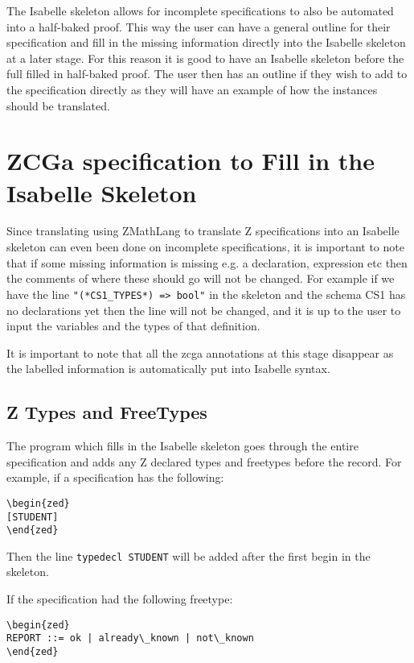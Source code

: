 The Isabelle skeleton allows for incomplete specifications to also be automated into a half-baked proof. This way the user can have a general outline for their specification and fill in the missing information directly into the Isabelle skeleton at a later stage. For this reason it is good to have an Isabelle skeleton before the full filled in half-baked proof. The user then has an outline if they wish to add to the specification directly as they will have an example of how the instances should be translated.

\section{ZCGa specification to Fill in the Isabelle Skeleton}
\label{sec:zcga2fillin}

Since translating using ZMathLang to translate Z specifications into an Isabelle skeleton can even been done on incomplete specifications, it is important to note that if some missing information is missing e.g. a declaration, expression etc then the comments of where these should go will not be changed. 
For example if we have the line \verb|"(*CS1_TYPES*) => bool"| in the skeleton and the schema CS1 has no declarations yet then the line will not be changed, and it is up to the user to input the variables and the types of that definition.

It is important to note that all the \gls{zcga} annotations at this stage disappear as the labelled information is automatically put into Isabelle syntax.

\subsection{Z Types and FreeTypes}

The program which fills in the Isabelle skeleton goes through the entire specification and adds any Z declared types and freetypes before the record. For example, if a specification has the following:
\begin{verbatim}
\begin{zed}
[STUDENT]
\end{zed}
\end{verbatim}

Then the line \verb|typedecl STUDENT| will be added after the first begin in the skeleton.

If the specification had the following freetype:
\begin{verbatim}
\begin{zed} 
REPORT ::= ok | already\_known | not\_known
\end{zed}
\end{verbatim}

